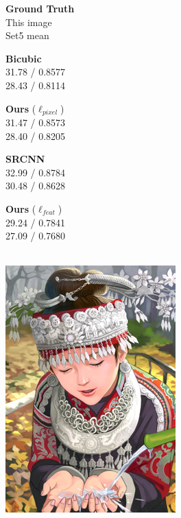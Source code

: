\documentclass[runningheads]{llncs}
\begin{document}
\begin{figure}[t]
  \vspace{1mm}
  \begin{minipage}{0.20\textwidth}
    \centering \textbf{Ground Truth} \\ This image \\ Set5 mean
  \end{minipage}
  \hspace{-0.02\textwidth}
  \begin{minipage}{\mywidth}
    \centering \textbf{Bicubic} \\ 31.78 / 0.8577 \\ 28.43 / 0.8114
  \end{minipage}
  \begin{minipage}{\mywidth}
    \centering \textbf{Ours} ($\ell_{pixel}$) \\ 31.47 / 0.8573 \\ 28.40 / 0.8205
  \end{minipage}
  \begin{minipage}{\mywidth}
    \centering \textbf{SRCNN}~\cite{dong2014learning} \\ 32.99 / 0.8784 \\ 30.48 / 0.8628
  \end{minipage}
  \begin{minipage}{\mywidth}
    \centering \textbf{Ours} ($\ell_{feat}$) \\ 29.24 / 0.7841 \\ 27.09 / 0.7680
  \end{minipage} \\
  \vspace{1mm}
  \includegraphics[width=\mywidth]{set14_5_orig.png}

\end{figure}
\end{document}
